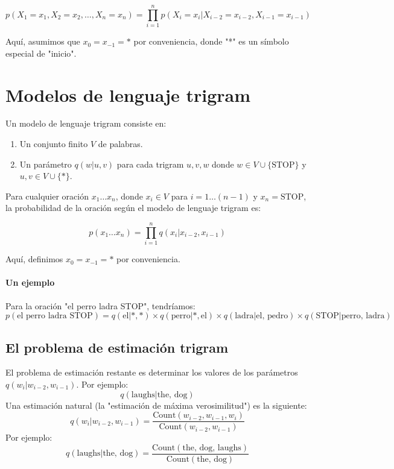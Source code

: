 \[
p(X_1 = x_1, X_2 = x_2, \ldots, X_n = x_n) = \prod_{i=1}^{n} p(X_i = x_i|X_{i-2} = x_{i-2}, X_{i-1} = x_{i-1})
\]

Aquí, asumimos que $x_0 = x_{-1} = *$ por conveniencia, donde "*" es un símbolo especial de "inicio".

\section{Modelos de lenguaje trigram}

Un modelo de lenguaje trigram consiste en:

\begin{enumerate}
  \item Un conjunto finito $V$ de palabras.
  \item Un parámetro $q(w|u, v)$ para cada trigram $u, v, w$ donde $w \in V \cup \{\text{STOP}\}$ y $u, v \in V \cup \{*\}$.
\end{enumerate}

Para cualquier oración $x_1 \ldots x_n$, donde $x_i \in V$ para $i = 1 \ldots (n-1)$ y $x_n = \text{STOP}$, la probabilidad de la oración según el modelo de lenguaje trigram es:

\[
p(x_1 \ldots x_n) = \prod_{i=1}^{n} q(x_i|x_{i-2}, x_{i-1})
\]

Aquí, definimos $x_0 = x_{-1} = *$ por conveniencia.

\paragraph{Un ejemplo}

Para la oración "el perro ladra STOP", tendríamos:
\[
p(\text{el perro ladra STOP}) = q(\text{el}|*, *) \times q(\text{perro}|*, \text{el}) \times q(\text{ladra}|\text{el, pedro}) \times q(\text{STOP}|\text{perro, ladra})
\]

\subsection{El problema de estimación trigram}

El problema de estimación restante es determinar los valores de los parámetros $q(w_i | w_{i-2}, w_{i-1})$. Por ejemplo:
\[
q(\text{laughs} | \text{the, dog})
\]
Una estimación natural (la "estimación de máxima verosimilitud") es la siguiente:
\[
q(w_i | w_{i-2}, w_{i-1}) = \frac{{\text{Count}(w_{i-2}, w_{i-1}, w_i)}}{{\text{Count}(w_{i-2}, w_{i-1})}}
\]
Por ejemplo:
\[
q(\text{laughs} | \text{the, dog}) = \frac{{\text{Count}(\text{the, dog, laughs})}}{{\text{Count}(\text{the, dog})}}
\]

